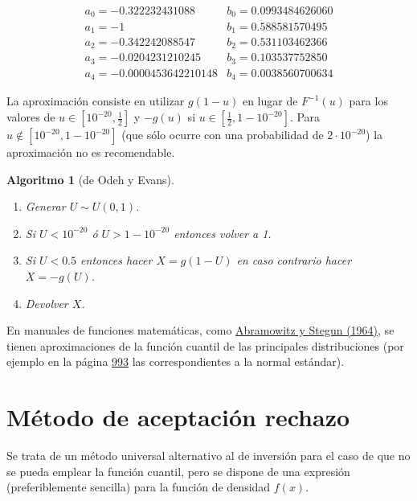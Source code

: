 \documentclass[
]{book}
\theoremstyle{break}
\newtheorem{conjecture}{Algoritmo}[chapter]
\theoremstyle{definition}
\theoremstyle{definition}
\theoremstyle{definition}
\theoremstyle{definition}
\theoremstyle{remark}
\begin{document}
\[\begin{array}{ll}
a_{0}=-0.322232431088 &  b_{0}=0.0993484626060 \\
a_{1}=-1 &  b_{1}=0.588581570495 \\
a_{2}=-0.342242088547 & b_{2}=0.531103462366 \\
a_{3}=-0.0204231210245 & b_{3}=0.103537752850 \\
a_{4}=-0.0000453642210148 & b_{4}=0.0038560700634
\end{array}\]

La aproximación consiste en utilizar \(g\left( 1-u\right)\) en lugar de
\(F^{-1}\left( u\right)\) para los valores de \(u\in[10^{-20},\frac12]\)
y \(-g\left( u\right)\) si \(u\in[\frac12,1-10^{-20}]\). Para \(u\notin [10^{-20},1-10^{-20}]\) (que sólo ocurre con una probabilidad de
\(2\cdot10^{-20}\)) la aproximación no es recomendable.

\begin{conjecture}[de Odeh y Evans]
\protect\hypertarget{cnj:Odeh-Evans}{}{\label{cnj:Odeh-Evans} {} }

\begin{enumerate}
\def\labelenumi{\arabic{enumi}.}
\item
  Generar \(U \sim U(0, 1)\).
\item
  Si \(U<10^{-20}\) ó \(U>1-10^{-20}\) entonces volver a 1.
\item
  Si \(U<0.5\) entonces hacer \(X=g\left(1-U\right)\)
  en caso contrario hacer \(X=-g\left( U\right)\).
\item
  Devolver \(X\).
\end{enumerate}
\end{conjecture}

En manuales de funciones matemáticas, como \href{https://www.math.ubc.ca/~cbm/aands/frameindex.htm}{Abramowitz y Stegun (1964)},
se tienen aproximaciones de la función cuantil de las principales distribuciones
(por ejemplo en la página \href{https://www.math.ubc.ca/~cbm/aands/page_933.htm}{993}
las correspondientes a la normal estándar).

\hypertarget{AR}{%
\section{Método de aceptación rechazo}\label{AR}}

Se trata de un método universal alternativo al de inversión para
el caso de que no se pueda emplear la función cuantil,
pero se dispone de una expresión (preferiblemente sencilla) para la
función de densidad \(f\left( x \right)\).
\end{document}
